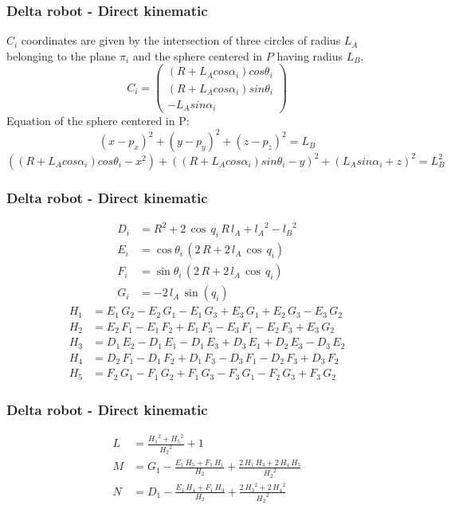 \begin{frame}
\frametitle{Delta robot - Direct kinematic}
	$C_i$ coordinates are given by the intersection of three circles of radius $L_A$ belonging to the plane $\pi_i$ and the sphere centered in $P$ having radius $L_B$.
	\[
	C_i =%
	\begin{pmatrix}
		(R + L_Acos\alpha_i)cos\theta_i\\
		(R + L_Acos\alpha_i)sin\theta_i\\
		-L_Asin\alpha_i
	\end{pmatrix}
	\]
	Equation of the sphere centered in P:
	\begin{equation}
		(x - p_x)^2 + (y - p_y)^2 + (z - p_z)^2 = L_B
	\end{equation}
	\begin{equation}
		((R + L_Acos\alpha_i)cos\theta_i - x^2) + ((R + L_Acos\alpha_i)sin\theta_i - y)^2 + (L_Asin\alpha_i + z)^2 = L_B^2
	\end{equation}

\end{frame}
\begin{frame}
	\frametitle{Delta robot - Direct kinematic}
	\begin{align}
		D_i &= R^2+2\,\cos\,q_{i}\,R\,l_{A}+{l_{A}}^2-{l_{B}}^2\\
		E_i &= \cos\theta _{i}\,\left(2\,R+2\,l_{A}\,\cos\,q_{i}\right)\\
		F_i &= \sin\theta _{i}\,\left(2\,R+2\,l_{A}\,\cos\,q_{i}\right)\\
		G_i &= -2\,l_{A}\,\sin\left(q_{i}\right)
	\end{align}
%
	\begin{align}
		H_1 &= E_{1}\,G_{2}-E_{2}\,G_{1}-E_{1}\,G_{3}+E_{3}\,G_{1}+E_{2}\,G_{3}-E_{3}\,G_{2}\\
		H_2 &= E_{2}\,F_{1}-E_{1}\,F_{2}+E_{1}\,F_{3}-E_{3}\,F_{1}-E_{2}\,F_{3}+E_{3}\,G_{2}\\
		H_3 &= D_{1}\,E_{2}-D_{1}\,E_{1}-D_{1}\,E_{3}+D_{3}\,E_{1}+D_{2}\,E_{3}-D_{3}\,E_{2}\\
		H_4 &= D_{2}\,F_{1}-D_{1}\,F_{2}+D_{1}\,F_{3}-D_{3}\,F_{1}-D_{2}\,F_{3}+D_{3}\,F_{2}\\
		H_5 &= F_{2}\,G_{1}-F_{1}\,G_{2}+F_{1}\,G_{3}-F_{3}\,G_{1}-F_{2}\,G_{3}+F_{3}\,G_{2}
	\end{align}
\end{frame}
%
\begin{frame}
\frametitle{Delta robot - Direct kinematic}
	\begin{align}
		L &= \frac{{H_{1}}^2+{H_{5}}^2}{{H_{2}}^2}+1\\
		M &= G_{1}-\frac{E_{1}\,H_{5}+F_{1}\,H_{1}}{H_{2}}+\frac{2\,H_{1}\,H_{3}+2\,H_{4}\,H_{5}}{{H_{2}}^2}\\
		N &= D_{1}-\frac{E_{1}\,H_{4}+F_{1}\,H_{3}}{H_{2}}+\frac{2\,{H_{3}}^2+2\,{H_{4}}^2}{{H_{2}}^2}
	\end{align}
\end{frame}
